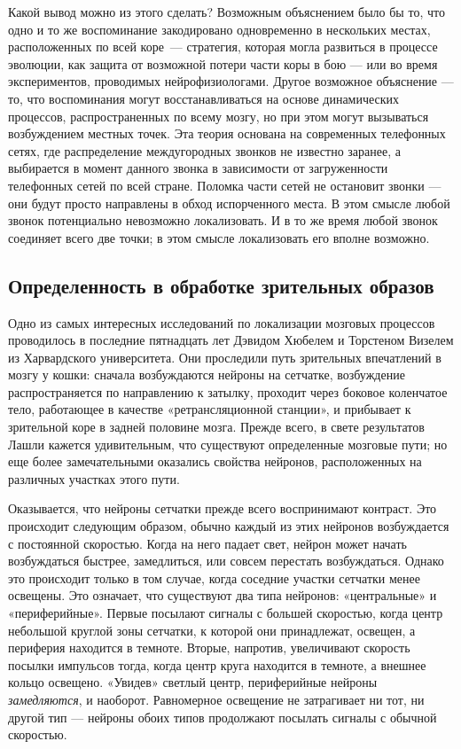 \documentclass[../main.tex]{subfiles}
\begin{document}
Какой вывод можно из этого сделать? Возможным объяснением было бы то, что одно и то же воспоминание закодировано одновременно в нескольких местах, расположенных по всей коре~--- стратегия, которая могла развиться в процессе эволюции, как защита от возможной потери части коры в бою --- или во время экспериментов, проводимых нейрофизиологами. Другое возможное объяснение --- то, что воспоминания могут восстанавливаться на основе динамических процессов, распространенных по всему мозгу, но при этом могут вызываться возбуждением местных точек. Эта теория основана на современных телефонных сетях, где распределение междугородных звонков не известно заранее, а выбирается в момент данного звонка в зависимости от загруженности телефонных сетей по всей стране. Поломка части сетей не остановит звонки --- они будут просто направлены в обход испорченного места. В этом смысле любой звонок потенциально невозможно локализовать. И в то же время любой звонок соединяет всего две точки; в этом смысле локализовать его вполне возможно.


\subsection{Определенность в обработке зрительных образов}

Одно из самых интересных исследований по локализации мозговых процессов проводилось в последние пятнадцать лет Дэвидом Хюбелем и Торстеном Визелем из Харвардского университета. Они проследили путь зрительных впечатлений в мозгу у кошки: сначала возбуждаются нейроны на сетчатке, возбуждение распространяется по направлению к затылку, проходит через боковое коленчатое тело, работающее в качестве «ретрансляционной станции», и прибывает к зрительной коре в задней половине мозга. Прежде всего, в свете результатов Лашли кажется удивительным, что существуют определенные мозговые пути; но еще более замечательными оказались свойства нейронов, расположенных на различных участках этого пути.

Оказывается, что нейроны сетчатки прежде всего воспринимают контраст. Это происходит следующим образом, обычно каждый из этих нейронов возбуждается с постоянной скоростью. Когда на него падает свет, нейрон может начать возбуждаться быстрее, замедлиться, или совсем перестать возбуждаться. Однако это происходит только в том случае, когда соседние участки сетчатки менее освещены. Это означает, что существуют два типа нейронов: «центральные» и «периферийные». Первые посылают сигналы с большей скоростью, когда центр небольшой круглой зоны сетчатки, к которой они принадлежат, освещен, а периферия находится в темноте. Вторые, напротив, увеличивают скорость посылки импульсов тогда, когда центр круга находится в темноте, а внешнее кольцо освещено. «Увидев» светлый центр, периферийные нейроны \emph{замедляются}, и наоборот. Равномерное освещение не затрагивает ни тот, ни другой тип --- нейроны обоих типов продолжают посылать сигналы с обычной скоростью.
\end{document}
